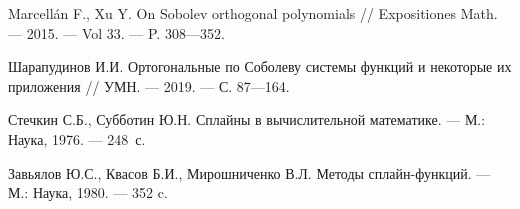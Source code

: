 \begin{thebibliography}{111}
  Marcellán F., Xu Y. 
  On Sobolev orthogonal polynomials
  //
  Expositiones Math.
  --- 2015.
  --- Vol 33.
  --- P. 308---352.

  Шарапудинов И.И. 
  Ортогональные по Соболеву системы функций и некоторые их приложения
  //
  УМН.
  --- 2019.
  --- С. 87---164.

  Стечкин С.Б., Субботин Ю.Н.
  Сплайны в вычислительной математике.
  --- М.: Наука, 1976.
  --- 248~с.

  Завьялов Ю.С., Квасов Б.И., Мирошниченко В.Л.
  Методы сплайн-функций.
  --- М.: Наука, 1980.
  --- 352 c.

\end{thebibliography} 